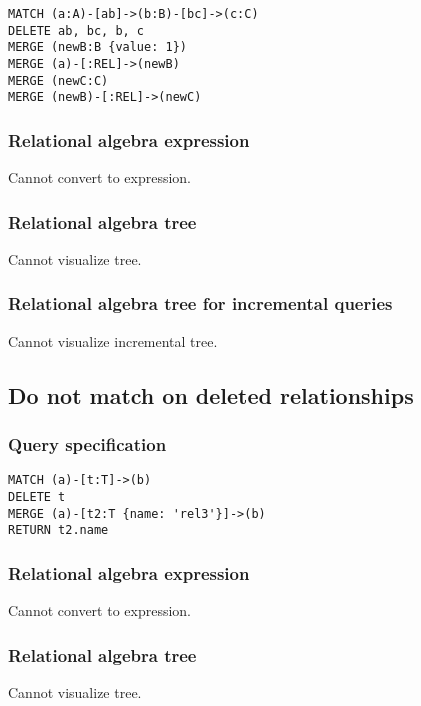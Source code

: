 \begin{lstlisting}
MATCH (a:A)-[ab]->(b:B)-[bc]->(c:C)
DELETE ab, bc, b, c
MERGE (newB:B {value: 1})
MERGE (a)-[:REL]->(newB)
MERGE (newC:C)
MERGE (newB)-[:REL]->(newC)
\end{lstlisting}

\subsubsection*{Relational algebra expression}

Cannot convert to expression.

\subsubsection*{Relational algebra tree}

Cannot visualize tree.

\subsubsection*{Relational algebra tree for incremental queries}

Cannot visualize incremental tree.

\subsection{Do not match on deleted relationships}

\subsubsection*{Query specification}

\begin{lstlisting}
MATCH (a)-[t:T]->(b)
DELETE t
MERGE (a)-[t2:T {name: 'rel3'}]->(b)
RETURN t2.name
\end{lstlisting}

\subsubsection*{Relational algebra expression}

Cannot convert to expression.

\subsubsection*{Relational algebra tree}

Cannot visualize tree.

